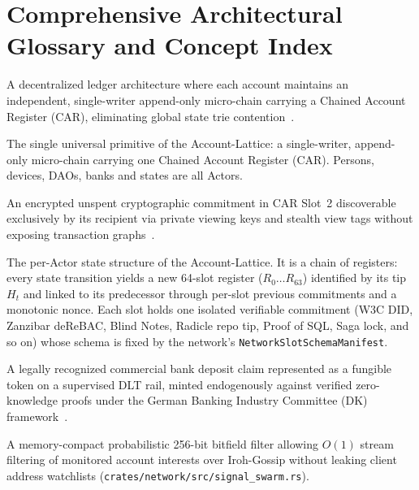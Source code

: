\documentclass[a4paper,11pt,twoside,parskip=half-,headings=small]{scrartcl}
\newcommand{\code}[1]{\texttt{#1}}
\begin{document}
\section{Comprehensive Architectural Glossary and Concept Index}
\label{app:glossary}
\label{sec:glossary}

\begin{description}[style=nextline,leftmargin=1.5em]
  \item[\hypertarget{glossary:account_lattice}{\textbf{Account-Lattice}} (\cref{sec:car})] A decentralized ledger architecture where each account maintains an independent, single-writer append-only micro-chain carrying a Chained Account Register (CAR), eliminating global state trie contention~\cite{lemahieu2018nano,buterin2021stateless}.
  \item[\hypertarget{glossary:actor}{\textbf{Actor}} (\cref{sec:car})] The single universal primitive of the Account-Lattice: a single-writer, append-only micro-chain carrying one Chained Account Register (CAR). Persons, devices, DAOs, banks and states are all Actors.
  \item[\hypertarget{glossary:blind_notes}{\textbf{Blind Note}} (\cref{sec:cross_chain_blind_notes})] An encrypted unspent cryptographic commitment in CAR Slot~2 discoverable exclusively by its recipient via private viewing keys and stealth view tags without exposing transaction graphs~\cite{williamson2022aztec,pedersen1991commitment}.
  \item[\hypertarget{glossary:car}{\textbf{CAR (Chained Account Register)}} (\cref{sec:car})] The per-Actor state structure of the Account-Lattice. It is a chain of registers: every state transition yields a new 64-slot register ($R_0 \dots R_{63}$) identified by its tip $H_t$ and linked to its predecessor through per-slot previous commitments and a monotonic nonce. Each slot holds one isolated verifiable commitment (W3C DID, Zanzibar deReBAC, Blind Notes, Radicle repo tip, Proof of SQL, Saga lock, and so on) whose schema is fixed by the network's \code{NetworkSlotSchemaManifest}.
  \item[\hypertarget{glossary:cbmt}{\textbf{CBMT (Commercial Bank Money Token)}} (\cref{sec:cbmt_pontes_comparison})] A legally recognized commercial bank deposit claim represented as a fungible token on a supervised DLT rail, minted endogenously against verified zero-knowledge proofs under the German Banking Industry Committee (DK) framework~\cite{dk2023cbmt}.
  \item[\hypertarget{glossary:cuckoo_signaling}{\textbf{Cuckoo Filter Address Signaling}} (\cref{sec:scoped_networks})] A memory-compact probabilistic 256-bit bitfield filter allowing $O(1)$ stream filtering of monitored account interests over Iroh-Gossip without leaking client address watchlists (\code{crates/network/src/signal\_swarm.rs}).

\end{description}
\end{document}
